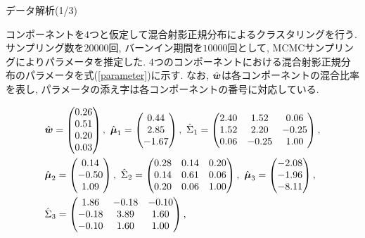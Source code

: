 \documentclass[dvipdfmx]{beamer} %
\newcommand{\bm}[1]{\mbox{\boldmath $#1$}}
\begin{document}
\begin{frame}{データ解析(1/3)}

コンポーネントを$4$つと仮定して混合射影正規分布によるクラスタリングを行う. サンプリング数を$20000$回, バーンイン期間を$10000$回として, MCMCサンプリングによりパラメータを推定した. $4$つのコンポーネントにおける混合射影正規分布のパラメータを式(\ref{parameter})に示す. なお, $\hat {\bm w}$は各コンポーネントの混合比率を表し, パラメータの添え字は各コンポーネントの番号に対応している.

\footnotesize %
\begin{equation}
\label{parameter}
\begin{split}
&\hat {\bm w} = \begin{pmatrix} 0.26 \\ 0.51 \\ 0.20 \\ 0.03 \\ \end{pmatrix},\ 
\hat{\bm \mu}_1 = \begin{pmatrix} 0.44 \\ 2.85 \\ -1.67 \\ \end{pmatrix},\ 
\hat \Sigma_1 = \begin{pmatrix}  2.40 & 1.52 &  0.06 \\ 1.52 & 2.20 & -0.25 \\ 0.06 & -0.25 &1.00 \\ \end{pmatrix},\\ 
&\hat{\bm \mu}_2 = \begin{pmatrix} 0.14 \\ -0.50 \\ 1.09 \\ \end{pmatrix},\ 
\hat \Sigma_2 = \begin{pmatrix}   0.28  & 0.14 &  0.20 \\ 0.14 & 0.61 & 0.06 \\  0.20 & 0.06 &1.00 \\ \end{pmatrix},\ 
\hat{\bm \mu}_3 = \begin{pmatrix} -2.08  \\ -1.96 \\ -8.11 \\ \end{pmatrix},\\ 
&\hat \Sigma_3 = \begin{pmatrix}  1.86  & -0.18 &  -0.10 \\-0.18 & 3.89 & 1.60 \\  -0.10 & 1.60 & 1.00 \\ \end{pmatrix},\ 

\end{split}
\end{equation}
\end{frame}
\end{document}
